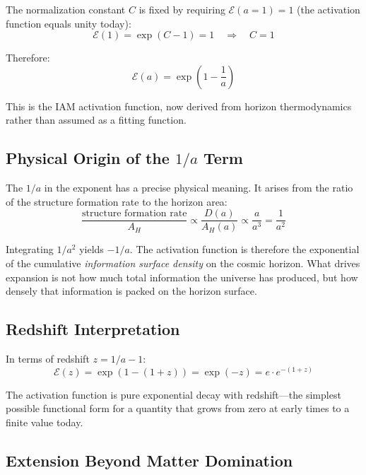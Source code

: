 \documentclass[twocolumn,superscriptaddress,prl,amsmath,amssymb]{revtex4-2}
\begin{document}
The normalization constant $C$ is fixed by requiring $\mathcal{E}(a=1) = 1$ (the activation function equals unity today):
\begin{equation}
\mathcal{E}(1) = \exp(C - 1) = 1 \quad \Longrightarrow \quad C = 1
\end{equation}

Therefore:
\begin{equation}
\boxed{\mathcal{E}(a) = \exp\left(1 - \frac{1}{a}\right)}
\label{eq:derived}
\end{equation}

This is the IAM activation function, now derived from horizon thermodynamics rather than assumed as a fitting function.

\subsection{Physical Origin of the $1/a$ Term}

The $1/a$ in the exponent has a precise physical meaning. It arises from the ratio of the structure formation rate to the horizon area:
\begin{equation}
\frac{\text{structure formation rate}}{A_H} \propto \frac{D(a)}{A_H(a)} \propto \frac{a}{a^3} = \frac{1}{a^2}
\end{equation}

Integrating $1/a^2$ yields $-1/a$. The activation function is therefore the exponential of the cumulative \textit{information surface density} on the cosmic horizon. What drives expansion is not how much total information the universe has produced, but how densely that information is packed on the horizon surface.

\subsection{Redshift Interpretation}

In terms of redshift $z = 1/a - 1$:
\begin{equation}
\mathcal{E}(z) = \exp(1 - (1+z)) = \exp(-z) = e \cdot e^{-(1+z)}
\end{equation}

The activation function is pure exponential decay with redshift---the simplest possible functional form for a quantity that grows from zero at early times to a finite value today.

\subsection{Extension Beyond Matter Domination}
\end{document}
